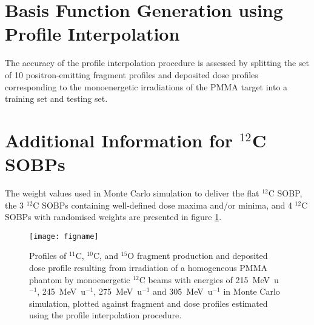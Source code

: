 \documentclass[demo]{OUP-EJ}
\begin{document}
\appendix

\section{Basis Function Generation using Profile Interpolation}\label{app:basis_interp}

The accuracy of the profile interpolation procedure is assessed by splitting the set of 10 positron-emitting fragment profiles and deposited dose profiles corresponding to the monoenergetic irradiations of the PMMA target into a training set and testing set.



\section{Additional Information for $^{12}$C SOBPs} \label{app:weights}

The weight values used in Monte Carlo simulation to deliver the flat $^{12}$C SOBP, the 3 $^{12}$C SOBPs containing well-defined dose maxima and/or minima, and 4 $^{12}$C SOBPs with randomised weights are presented in figure  \ref{fig:prof_interp_validation}.


\begin{figure}[!b]
\centering\texttt{[image: figname]}
\caption{Profiles of $^{11}$C, $^{10}$C, and $^{15}$O fragment production and deposited dose profile resulting from irradiation of a homogeneous PMMA phantom by monoenergetic $^{12}$C beams with energies of 215~MeV\ u$^{-1}$, 245~MeV\ u$^{-1}$, 275~MeV\ u$^{-1}$ and 305~MeV\ u$^{-1}$ in Monte Carlo simulation, plotted against fragment and dose profiles estimated using the profile interpolation procedure.}\label{fig:prof_interp_validation}
\end{figure}
\end{document}
